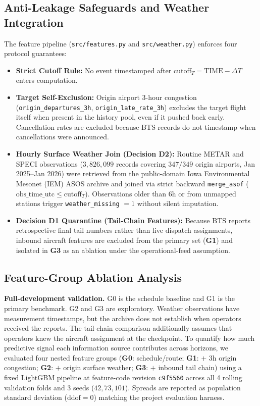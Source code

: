 \subsection{Anti-Leakage Safeguards and Weather Integration}
The feature pipeline (\texttt{src/features.py} and \texttt{src/weather.py}) enforces four protocol guarantees:
\begin{itemize}\raggedright
    \item \textbf{Strict Cutoff Rule:} No event timestamped after $\text{cutoff}_T = \text{TIME} - \Delta T$ enters computation.
    \item \textbf{Target Self-Exclusion:} Origin airport 3-hour congestion (\texttt{origin\_departures\_3h}, \texttt{origin\_late\_rate\_3h}) excludes the target flight itself when present in the history pool, even if it pushed back early. Cancellation rates are excluded because BTS records do not timestamp when cancellations were announced.
    \item \textbf{Hourly Surface Weather Join (Decision D2):} Routine METAR and SPECI observations ($3{,}826{,}099$ records covering $347/349$ origin airports, Jan 2025--Jan 2026) were retrieved from the public-domain Iowa Environmental Mesonet (IEM) ASOS archive and joined via strict backward \texttt{merge\_asof} ($\text{obs\_time\_utc} \le \text{cutoff}_T$). Observations older than $6\text{h}$ or from unmapped stations trigger \texttt{weather\_missing} $= 1$ without silent imputation.
    \item \textbf{Decision D1 Quarantine (Tail-Chain Features):} Because BTS reports retrospective final tail numbers rather than live dispatch assignments, inbound aircraft features are excluded from the primary set (\textbf{G1}) and isolated in \textbf{G3} as an ablation under the operational-feed assumption.
\end{itemize}

\subsection{Feature-Group Ablation Analysis}
\textbf{Full-development validation.} G0 is the schedule baseline and G1 is the primary benchmark. G2 and G3 are exploratory. Weather observations have measurement timestamps, but the archive does not establish when operators received the reports. The tail-chain comparison additionally assumes that operators knew the aircraft assignment at the checkpoint. To quantify how much predictive signal each information source contributes across horizons, we evaluated four nested feature groups (\textbf{G0}: schedule/route; \textbf{G1}: $+$ 3h origin congestion; \textbf{G2}: $+$ origin surface weather; \textbf{G3}: $+$ inbound tail chain) using a fixed LightGBM pipeline at feature-code revision \texttt{c9f5560} across all 4 rolling validation folds and 3 seeds ($42, 73, 101$). Spreads are reported as population standard deviation ($\text{ddof}=0$) matching the project evaluation harness.

